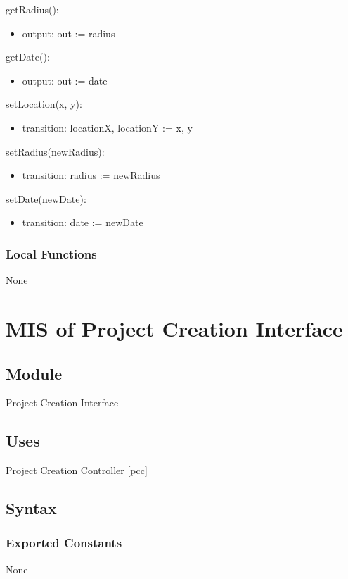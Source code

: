 \documentclass[12pt, titlepage]{article}
\begin{document}
\noindent getRadius():
\begin{itemize}
\item output: out := radius
\end{itemize}

\noindent getDate():
\begin{itemize}
\item output: out := date
\end{itemize}

\noindent setLocation(x, y):
\begin{itemize}
\item transition: locationX, locationY := x, y 
\end{itemize}

\noindent setRadius(newRadius):
\begin{itemize}
\item transition: radius := newRadius
\end{itemize}

\noindent setDate(newDate):
\begin{itemize}
\item transition: date := newDate 
\end{itemize}

\subsubsection{Local Functions}
None

\section{MIS of Project Creation Interface} \label{pci}

\subsection{Module}

Project Creation Interface

\subsection{Uses}

Project Creation Controller \ref{pcc}

\subsection{Syntax}

\subsubsection{Exported Constants}
None
\end{document}
